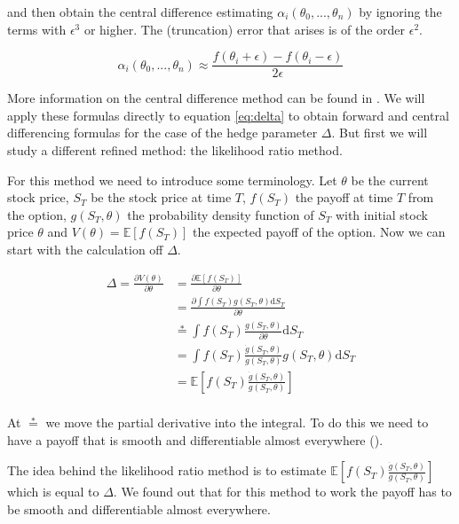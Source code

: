 \documentclass[11pt,a4paper]{article}
\begin{document}
and then obtain the central difference estimating $\alpha_i(\theta_0,...,\theta_n)$ by ignoring the terms with $\epsilon^3$ or higher. The (truncation) error that arises is of the order $\epsilon^2$.

\begin{equation}
\label{eq:cd}
\alpha_i(\theta_0,...,\theta_n) \approx \frac{f(\theta_i + \epsilon) - f(\theta_i - \epsilon)}{2\epsilon}
\end{equation}

More information on the central difference method can be found in \cite{heath}. We will apply these formulas directly to equation \ref{eq:delta} to obtain forward and central differencing formulas for the case of the hedge parameter $\Delta$. But first we will study a different refined method: the likelihood ratio method. 

For this method we need to introduce some terminology. Let $\theta$ be the current stock price, $S_T$ be the stock price at time $T$, $f(S_T)$ the payoff at time $T$ from the option, $g(S_T,\theta)$ the probability density function of $S_T$ with initial stock price $\theta$ and $V(\theta)=\mathbb{E}[f(S_T)]$ the expected payoff of the option. Now we can start with the calculation off $\Delta$.

\begin{align}
\Delta=\frac{\partial V(\theta)}{\partial \theta}&=\frac{\partial \mathbb{E}[f(S_T)]}{\partial \theta}\\
&=\frac{\partial \int f(S_T)g(S_T,\theta)\mathrm{d}S_T}{\partial \theta}\\
&\stackrel{*}{=}\int f(S_T) \frac{g(S_T,\theta)}{\partial \theta} \mathrm{d}S_T\\
&=\int f(S_T) \frac{\dot{g}(S_T,\theta)}{g(S_T,\theta)} g(S_T,\theta) \mathrm{d}S_T\\
&=\mathbb{E}\left[f(S_T) \frac{\dot{g}(S_T,\theta)}{g(S_T,\theta)}\right]\\
\end{align}

At $\stackrel{*}{=}$ we move the partial derivative into the integral. To do this we need to have a payoff that is smooth and differentiable almost everywhere (\cite{savickas}).

The idea behind the likelihood ratio method is to estimate $\mathbb{E}\left[f(S_T) \frac{\dot{g}(S_T,\theta)}{g(S_T,\theta)}\right]$ which is equal to $\Delta$. We found out that for this method to work the payoff has to be smooth and differentiable almost everywhere.
\end{document}
